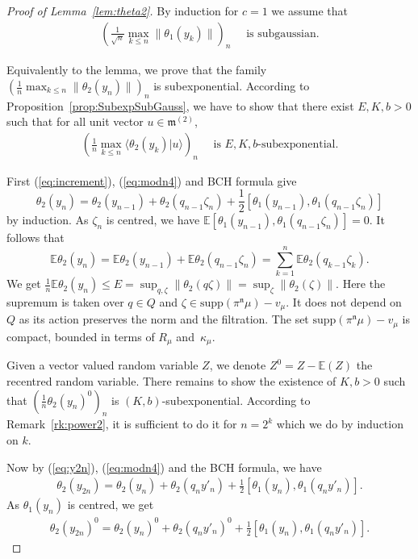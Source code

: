 \documentclass[10pt,a4paper]{amsart}
\newcommand{\E}{\mathbb{E}}
\begin{document}
\begin{proof}[Proof of Lemma~\ref{lem:theta2}]
By induction for $c=1$ we assume that 
\begin{align}\label{eq:theta1}
\left( \frac{1}{\sqrt{n}}\max_{k\le n}\|\theta_1(y_k)\| \right)_n \quad  \textrm{ is subgaussian.}
\end{align}

Equivalently to the lemma, we prove that the family $\left(\frac{1}{n}\max_{k\le n}\|\theta_2(y_n)\|\right)_n$ is subexponential. According to Proposition~\ref{prop:SubexpSubGauss}, we have to show that there exist $E,K,b>0$ such that for all unit vector $u \in \mathfrak{m}^{(2)}$, 
\begin{align}\label{eq:scalu}
\left(\frac{1}{n} \max_{k \le n} \langle \theta_2(y_k) |u \rangle \right)_n \quad \textrm{ is }E,K,b\textrm{-subexponential.}
\end{align}

First (\ref{eq:increment}), (\ref{eq:modn4}) and BCH formula give
\[
\theta_2(y_n)=\theta_2(y_{n-1})+\theta_2(q_{n-1}\zeta_n)+\frac{1}{2}\left[\theta_1(y_{n-1}),\theta_1(q_{n-1}\zeta_n)\right]
\]
by induction.
As $\zeta_n$ is centred, we have $\mathbb{E}\left[\theta_1(y_{n-1}),\theta_1(q_{n-1}\zeta_n)\right]=0$. It follows that 
\[
\mathbb{E}\theta_2(y_n)=\mathbb{E}\theta_2(y_{n-1})+\mathbb{E}\theta_2(q_{n-1}\zeta_n)=\sum_{k=1}^n \mathbb{E}\theta_2(q_{k-1}\zeta_k).
\]
We get $\frac{1}{n}\mathbb{E}\theta_2(y_n) \le E=\sup_{q,\zeta}\|\theta_2(q\zeta)\|=\sup_\zeta\|\theta_2(\zeta)\|$. Here the supremum is taken over $q\in Q$ and $\zeta \in \mathrm{supp}(\pi^\mathfrak{n}\mu)-v_\mu$. It does not depend on $Q$ as its action preserves the norm and the filtration.  
The set $\mathrm{supp}(\pi^\mathfrak{n}\mu)-v_\mu$ is compact, bounded in terms of $R_\mu$ and~$\kappa_\mu$.

Given a vector valued random variable $Z$, we denote $Z^0=Z-\E(Z)$ the recentred random variable. There remains to show the existence of $K,b>0$ such that $\left(\frac{1}{n}\theta_2(y_n)^0\right)_n$ is $(K,b)$-subexponential. According to Remark~\ref{rk:power2}, it is sufficient to do it for $n=2^k$ which we do by induction on $k$. 

Now by (\ref{eq:y2n}), (\ref{eq:modn4}) and the BCH formula, we have
\begin{align*}
\theta_2(y_{2n})=\theta_2(y_n)+\theta_2(q_ny'_n)+\frac{1}{2}\left[ \theta_1(y_n),\theta_1(q_n y'_n)\right].
\end{align*}
As $\theta_1(y_n)$ is centred, we get
\begin{align}\label{eq:th2y}
\theta_2(y_{2n})^0=\theta_2(y_n)^0+\theta_2(q_ny'_n)^0+\frac{1}{2}\left[ \theta_1(y_n),\theta_1(q_n y'_n)\right].
\end{align}


\end{proof}
\end{document}
